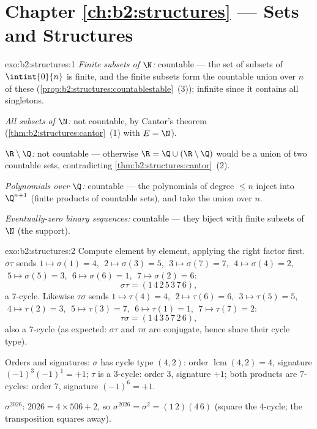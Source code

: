 \section*{Chapter \ref{ch:b2:structures} --- Sets and Structures}

\begin{solution}{exo:b2:structures:1}
\emph{Finite subsets of $\N$:} countable --- the set of subsets of
$\intint{0}{n}$ is finite, and the finite subsets form the countable
union over $n$ of these
(\cref{prop:b2:structures:countablestable}~(3)); infinite since it
contains all singletons.

\emph{All subsets of $\N$:} not countable, by Cantor's theorem
(\cref{thm:b2:structures:cantor}~(1) with $E = \N$).

\emph{$\R \setminus \Q$:} not countable --- otherwise $\R = \Q \cup
(\R\setminus\Q)$ would be a union of two countable sets,
contradicting \cref{thm:b2:structures:cantor}~(2).

\emph{Polynomials over $\Q$:} countable --- the polynomials of degree
$\leq n$ inject into $\Q^{n+1}$ (finite products of countable sets),
and take the union over $n$.

\emph{Eventually-zero binary sequences:} countable --- they biject with
finite subsets of $\N$ (the support).
\end{solution}

\begin{solution}{exo:b2:structures:2}
Compute element by element, applying the right factor first.
$\sigma\tau$ sends $1 \mapsto \sigma(1) = 4$, $\;2 \mapsto \sigma(3)
= 5$, $\;3 \mapsto \sigma(7) = 7$, $\;4 \mapsto \sigma(4) = 2$, $\;5
\mapsto \sigma(5) = 3$, $\;6 \mapsto \sigma(6) = 1$, $\;7 \mapsto
\sigma(2) = 6$:
\[
\sigma\tau = (1\,4\,2\,5\,3\,7\,6),
\]
a $7$-cycle. Likewise $\tau\sigma$ sends $1 \mapsto \tau(4) = 4$,
$\;2 \mapsto \tau(6) = 6$, $\;3 \mapsto \tau(5) = 5$, $\;4 \mapsto
\tau(2) = 3$, $\;5 \mapsto \tau(3) = 7$, $\;6 \mapsto \tau(1) = 1$,
$\;7 \mapsto \tau(7) = 2$:
\[
\tau\sigma = (1\,4\,3\,5\,7\,2\,6),
\]
also a $7$-cycle (as expected: $\sigma\tau$ and $\tau\sigma$ are
conjugate, hence share their cycle type).

Orders and signatures: $\sigma$ has cycle type $(4,2)$: order
$\operatorname{lcm}(4,2) = 4$, signature $(-1)^3(-1)^1 = +1$; $\tau$
is a $3$-cycle: order $3$, signature $+1$; both products are
$7$-cycles: order $7$, signature $(-1)^6 = +1$.

$\sigma^{2026}$: $2026 = 4 \times 506 + 2$, so $\sigma^{2026} =
\sigma^2 = (1\,2)(4\,6)$ (square the $4$-cycle; the transposition
squares away).
\end{solution}


